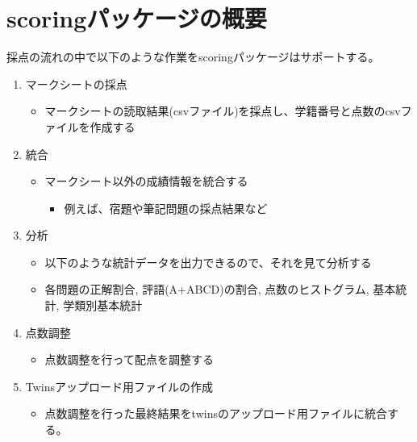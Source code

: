 \def\latexktupreamblefile{scoring_manual.ktu_preamble}
\def\mytitle{scoringパッケージ}
\def\myauthor{山本}
\def\mydate{2019.6.25}
\def\latexxspacing{no}


\newcommand {\mycolor }{olive}

\section{scoringパッケージの概要}
\label{scoringパッケージの概要}

採点の流れの中で以下のような作業をscoringパッケージはサポートする。

\begin{enumerate}
\item マークシートの採点

\begin{itemize}
\item マークシートの読取結果(csvファイル)を採点し、学籍番号と点数のcsvファイルを作成する

\end{itemize}

\item 統合

\begin{itemize}
\item マークシート以外の成績情報を統合する

\begin{itemize}
\item 例えば、宿題や筆記問題の採点結果など

\end{itemize}

\end{itemize}

\item 分析

\begin{itemize}
\item 以下のような統計データを出力できるので、それを見て分析する

\item 各問題の正解割合, 評語(A+ABCD)の割合, 点数のヒストグラム, 基本統計, 学類別基本統計

\end{itemize}

\item 点数調整

\begin{itemize}
\item 点数調整を行って配点を調整する

\end{itemize}

\item Twinsアップロード用ファイルの作成

\begin{itemize}
\item 点数調整を行った最終結果をtwinsのアップロード用ファイルに統合する。

\end{itemize}

\end{enumerate}

